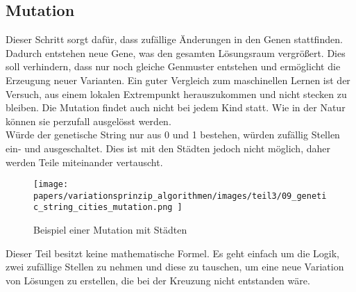 %
%
%
%
\subsection{Mutation
\label{genetic_algorithm:mutation}}
Dieser Schritt sorgt dafür, dass zufällige Änderungen in 
den Genen stattfinden. Dadurch entstehen neue Gene, was den 
gesamten Lösungsraum vergrößert. Dies soll verhindern, 
dass nur noch gleiche Genmuster entstehen und ermöglicht 
die Erzeugung neuer Varianten. Ein guter Vergleich zum 
maschinellen Lernen ist der Versuch, aus einem lokalen 
Extrempunkt herauszukommen und nicht stecken zu bleiben.
Die Mutation findet auch nicht bei jedem Kind statt. Wie 
in der Natur können sie perzufall ausgelösst werden.
\\
Würde der genetische String nur aus 0 und 1 bestehen, 
würden zufällig Stellen ein- und ausgeschaltet. Dies 
ist mit den Städten jedoch nicht möglich, daher werden 
Teile miteinander vertauscht.

\begin{figure} [h]
	\centering
	\texttt{[image: 
        papers/variationsprinzip\_algorithmen/images/teil3/09\_genetic\_string\_cities\_mutation.png
        ]}
	\caption{Beispiel einer Mutation mit Städten}
	\label{fig:mutation_genetic_string}
\end{figure}

Dieser Teil besitzt keine mathematische Formel. Es geht einfach 
um die Logik, zwei zufällige Stellen zu nehmen und diese zu 
tauschen, um eine neue Variation von Lösungen zu erstellen, die 
bei der Kreuzung nicht entstanden wäre.

